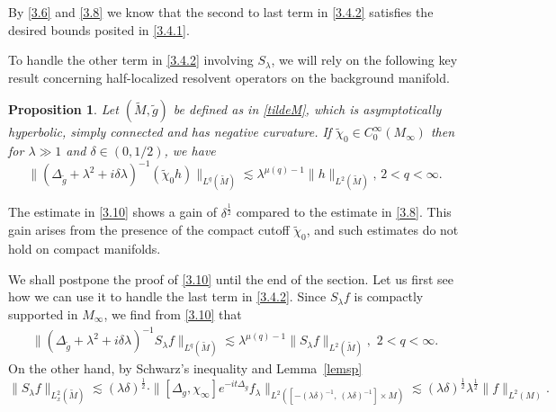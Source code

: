 \documentclass[10pt]{amsart}
\newtheorem{proposition}[theorem]{Proposition}
\newcommand{\la}{\lambda}
\newcommand{\1}{{\bf 1}}
\begin{document}
By \eqref{3.6} and \eqref{3.8} we know that the second to last term in \eqref{3.4.2} satisfies the desired bounds  posited in 
\eqref{3.4.1}.  


To handle the other term in \eqref{3.4.2}
 involving $S_\la$, we will rely on the following key result concerning half-localized resolvent
operators on the background manifold.
\begin{proposition}\label{keya}
Let $(\tilde M,\tilde g)$ be defined as in \eqref{tildeM}, which is asymptotically hyperbolic, simply connected and has negative curvature. If $\tilde \chi_0\in C^\infty_0(M_\infty)$ then for $\la\gg 1$ and $\delta\in (0,1/2)$, we have 
\begin{equation}\label{3.10}
\| (\Delta_{\tilde g}+\la^2+i\delta \la)^{-1} (\tilde \chi_0 h)\|_{L^q(\tilde M)}\lesssim 
    \la^{\mu(q)-1}\|h\|_{L^2(\tilde M)},\, 2<q<\infty.
\end{equation}
\end{proposition}


The estimate in \eqref{3.10} shows a gain of $\delta^{\frac12}$
  compared to the estimate in \eqref{3.8}. This gain arises from the presence of the compact cutoff 
$\tilde \chi_0$, and such estimates do not hold on compact manifolds.


We shall postpone the proof of \eqref{3.10} until the end of the section. 
Let us first see how we can use it to handle the last term in \eqref{3.4.2}.  Since $S_\la f $ is 
compactly supported in $M_\infty$, we find from \eqref{3.10}  that
\begin{equation}
    \begin{aligned}
        \| (\Delta_{\tilde g}+\la^2+i\delta \la)^{-1} S_\la f\|_{L^q(\tilde M)}\lesssim 
    \la^{\mu(q)-1}\|S_\la f\|_{L^2( \tilde M)},  \, \,  2<q<\infty.
    \end{aligned}
\end{equation}
On the other hand,  by Schwarz's inequality and Lemma~\ref{lemsp}
$$\|S_\la f\|_{L^2_x(\tilde M)}
\lesssim (\la\delta)^{\frac12}\cdot 
\| [\Delta_g, \chi_\infty] e^{-it\Delta_g}f_\la \|_{L^2([-(\la\delta)^{-1}, \, (\la\delta)^{-1}]\times M)}\lesssim (\la\delta)^{\frac12} \la^{\frac12}\|f\|_{L^2(M)}.$$
\end{document}
